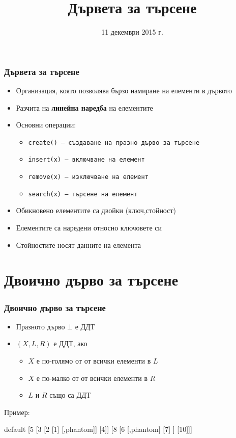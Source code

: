 \documentclass{beamer}
\title{Дървета за търсене}
\date{11 декември 2015 г.}
\newcommand{\samplebinordtree}{%
  \begin{forest}
    default [5 [3 [2 [1] [,phantom]] [4]] [8 [6 [,phantom] [7] ] [10]]]
  \end{forest}%
}
\begin{document}
\begin{frame}
  \titlepage
\end{frame}

\begin{frame}
  \frametitle{Дървета за търсене}
  \begin{itemize}
  \item Организация, която позволява бързо намиране на елементи в дървото
  \item Разчита на \textbf{линейна наредба} на елементите
  \item Основни операции:
    \begin{itemize}
    \item \tt{create()} --- създаване на празно дърво за търсене
    \item \tt{insert(x)} --- включване на елемент
    \item \tt{remove(x)} --- изключване на елемент
    \item \tt{search(x)} --- търсене на елемент
    \end{itemize}
  \item Обикновено елементите са двойки (ключ,стойност)
  \item Елементите са наредени относно ключовете си
  \item Стойностите носят данните на елемента
  \end{itemize}
\end{frame}

\section{Двоично дърво за търсене}

\begin{frame}
  \frametitle{Двоично дърво за търсене}
  \begin{definition}
    \begin{itemize}
    \item Празното дърво $\bot$ е ДДТ
    \item $(X,L,R)$ е ДДТ, ако
      \begin{itemize}
      \item $X$ е по-голямо от от всички елементи в $L$
      \item $X$ е по-малко от от всички елементи в $R$
      \item $L$ и $R$ също са ДДТ
      \end{itemize}
    \end{itemize}
  \end{definition}
  \pause
  Пример:
  \vspace{-1em}
  \begin{center}
    \small
    \samplebinordtree
  \end{center}
\end{frame}
\end{document}
